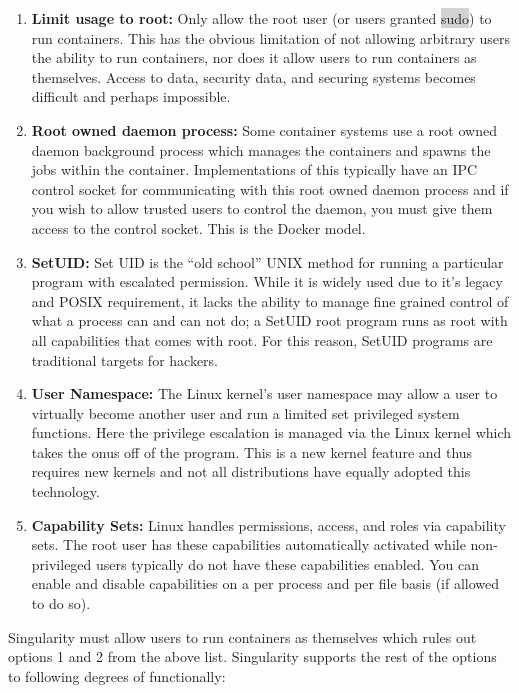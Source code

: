 \documentclass[a4paper]{article}
\newcounter{subsubsubsection}[subsubsection]
\begin{document}
\begin{enumerate}
\item \textbf{Limit usage to root:} Only allow the root user (or users granted \colorbox{lightgray}{sudo}) to run containers. This has the obvious limitation of not allowing arbitrary users the ability to run containers, nor does it allow users to run containers as themselves. Access to data, security data, and securing systems becomes difficult and perhaps impossible.
\item \textbf{Root owned daemon process:} Some container systems use a root owned daemon background process which manages the containers and spawns the jobs within the container. Implementations of this typically have an IPC control socket for communicating with this root owned daemon process and if you wish to allow trusted users to control the daemon, you must give them access to the control socket. This is the Docker model.
\item \textbf{SetUID:} Set UID is the “old school” UNIX method for running a particular program with escalated permission. While it is widely used due to it’s legacy and POSIX requirement, it lacks the ability to manage fine grained control of what a process can and can not do; a SetUID root program runs as root with all capabilities that comes with root. For this reason, SetUID programs are traditional targets for hackers.
\item \textbf{User Namespace:} The Linux kernel’s user namespace may allow a user to virtually become another user and run a limited set privileged system functions. Here the privilege escalation is managed via the Linux kernel which takes the onus off of the program. This is a new kernel feature and thus requires new kernels and not all distributions have equally adopted this technology.
\item \textbf{Capability Sets:} Linux handles permissions, access, and roles via capability sets. The root user has these capabilities automatically activated while non-privileged users typically do not have these capabilities enabled. You can enable and disable capabilities on a per process and per file basis (if allowed to do so).

\end{enumerate}



Singularity must allow users to run containers as themselves which rules out options 1 and 2 from the above list. Singularity supports the rest of the options to following degrees of functionally:
\end{document}
